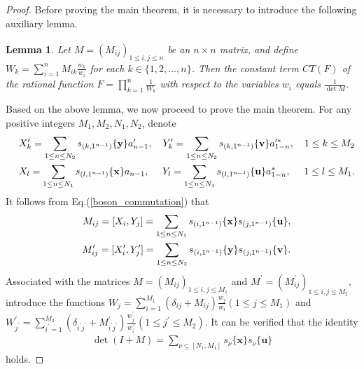 \documentclass[11pt,reqno]{amsart}
\numberwithin{equation}{section}
\newtheorem{lemma}[theorem]{Lemma}
\begin{document}
\begin{proof}
Before proving the main theorem,  it is necessary to introduce the following auxiliary lemma.
\begin{lemma}\textsuperscript{\cite{bosoncorreclation}}
Let $M=(M_{ij})_{1\leq i,j\leq n}$ be an $n\times n$ matrix, and define $W_{k}=\sum\limits^{n}_{i=1}M_{ik}\frac{w_{k}}{w_{i}}$ for each $k\in\{1,2,\ldots,n\}$. Then the constant term $CT(F)$ of  the rational function $F=\prod\limits^{n}_{k=1}\frac{1}{W_{k}}$  with respect to the variables $w_{i}$ equals $\frac{1}{\det M}$.
\end{lemma}
Based on the above lemma, we now proceed to prove the main theorem. For any positive integers $M_{1}, M_{2},N_{1}, N_{2}$, denote
\begin{eqnarray}
&&X^{\prime}_{k}=\sum\limits_{1\leq n\leq N_{2}}s_{(k,1^{n-1})}\{\mathbf{y}\}a^{\prime}_{n-1},\quad Y^{\prime}_{k}=\sum\limits_{1\leq n\leq N_{2}}s_{(k,1^{n-1})}\{\mathbf{v}\}a^{\prime\ast}_{1-n}
,\quad 1\leq k\leq M_{2}\notag\\
&&X_{l}=\sum\limits_{1\leq n\leq N_{1}}s_{(l,1^{n-1})}\{\mathbf{x}\}a_{n-1},\quad \ Y_{l}=\sum\limits_{1\leq n\leq N_{1}}s_{(l,1^{n-1})}\{\mathbf{u}\}a^{\ast}_{1-n},\quad \ 1\leq l\leq M_{1}.
\end{eqnarray}
It follows from Eq.(\ref{boson_commutation}) that
\begin{eqnarray}
&&M_{ij}=[X_{i},Y_{j}]=\sum\limits_{1\leq n\leq N_{1}}s_{(i,1^{n-1})}\{\mathbf{x}\}s_{(j,1^{n-1})}\{\mathbf{u}\},\notag\\
&&M^{\prime}_{ij}=[X^{\prime}_{i},Y^{\prime}_{j}]=\sum\limits_{1\leq n\leq N_{2}}s_{(i,1^{n-1})}\{\mathbf{y}\}s_{(j,1^{n-1})}\{\mathbf{v}\}.
\end{eqnarray}
Associated with the matrices $M=(M_{ij})_{1\leq i,j\leq M_{1}}$ and $M^{\prime}=(M^{\prime}_{ij})_{1\leq i,j\leq M_{2}}$, introduce the functions
$W_{j}=\sum\limits^{M_{1}}_{i=1}\left(\delta_{ij}+M_{ij}\right)\frac{w_{j}}{w_{i}}(1\leq j\leq M_{1})$ and $W^{\prime}_{j^{\prime}}=\sum\limits^{M_{2}}_{i^{\prime}=1}
\left(\delta_{i^{\prime}j^{\prime}}+M^{\prime}_{i^{\prime}j^{\prime}}\right)
\frac{w^{\prime}_{j^{\prime}}}{w^{\prime}_{i^{\prime}}}(1\leq j^{\prime}\leq M_{2})$. It can be verified that the identity
\begin{eqnarray}
\det(I+M)=\sum\limits_{\nu\subseteq[N_{1},M_{1}]}s_{\nu}\{\mathbf{x}\}
s_{\nu}\{\mathbf{u}\}
\end{eqnarray}
holds.



\end{proof}
\end{document}
